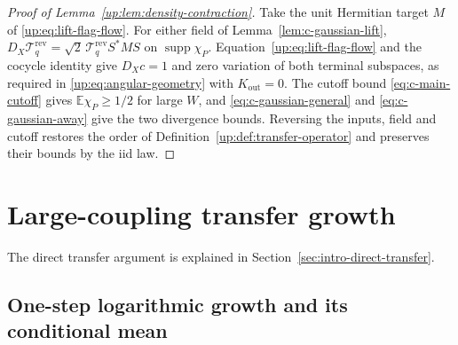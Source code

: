 \documentclass[11pt]{article}
\numberwithin{equation}{section}
\theoremstyle{remark}
\newcommand{\E}{\mathbb E}
\newcommand{\supp}{\operatorname{supp}}
\begin{document}
\begin{proof}[Proof of Lemma~\ref{up:lem:density-contraction}]
Take the unit Hermitian target $M$ of \eqref{up:eq:lift-flag-flow}.
For either field of Lemma~\ref{lem:c-gaussian-lift},
$D_X\mathcal T_q^{\mathrm{rev}}=\sqrt2\,\mathcal T_q^{\mathrm{rev}}S^*MS$
on $\supp\chi_P$. Equation~\eqref{up:eq:lift-flag-flow} and the cocycle
identity give $D_Xc=1$ and zero variation of both terminal subspaces,
as required in \eqref{up:eq:angular-geometry} with $K_{\mathrm{out}}=0$.
The cutoff bound \eqref{eq:c-main-cutoff} gives $\E\chi_P\ge1/2$ for
large $W$, and \eqref{eq:c-gaussian-general} and \eqref{eq:c-gaussian-away}
give the two divergence bounds. Reversing the inputs, field and cutoff
restores the order of Definition~\ref{up:def:transfer-operator} and
preserves their bounds by the iid law.
\end{proof}

\section{Large-coupling transfer growth}
\label{sec:large-upper-proof}

The direct transfer argument is explained in Section~\ref{sec:intro-direct-transfer}.

\subsection{One-step logarithmic growth and its conditional mean}
\label{lg:sec:scalar-growth}
\end{document}
